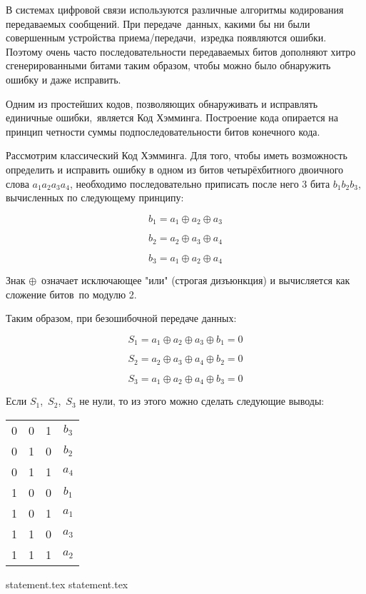 В системах цифровой связи используются различные алгоритмы кодирования передаваемых сообщений. При передаче данных, какими бы ни были совершенным устройства приема/передачи, изредка появляются ошибки. Поэтому очень часто последовательности передаваемых битов дополняют хитро сгенерированными битами таким образом, чтобы можно было обнаружить ошибку и даже исправить.

Одним из простейших кодов, позволяющих обнаруживать и исправлять единичные ошибки, является Код Хэмминга. Построение кода опирается на принцип четности суммы подпоследовательности битов конечного кода.

Рассмотрим классический Код Хэмминга. Для того, чтобы иметь возможность определить и исправить ошибку в одном из битов четырёхбитного двоичного слова $a_1a_2a_3a_4$, необходимо последовательно приписать после него 3 бита $b_1b_2b_3$, вычисленных по следующему принципу:

$$b_1 = a_1 \oplus a_2 \oplus a_3 $$

$$b_2 = a_2 \oplus a_3 \oplus a_4 $$

$$b_3 = a_1 \oplus a_2 \oplus a_4 $$

Знак $\oplus$ означает исключающее "или" (строгая дизъюнкция) и вычисляется как сложение битов по модулю 2.

Таким образом, при безошибочной передаче данных:

$$S_1 = a_1 \oplus a_2 \oplus a_3 \oplus b_1 = 0 $$

$$S_2 = a_2 \oplus a_3 \oplus a_4 \oplus b_2 = 0 $$

$$S_3 = a_1 \oplus a_2 \oplus a_4 \oplus b_3 = 0 $$

Если $S_1$, $S_2$, $S_3$ не нули, то из этого можно сделать следующие выводы:

\begin{tabular}{c c c c}
    0 & 0 & 1 & $b_3$ \\
    0 & 1 & 0 & $b_2$ \\
    0 & 1 & 1 & $a_4$ \\
    1 & 0 & 0 & $b_1$ \\
    1 & 0 & 1 & $a_1$ \\
    1 & 1 & 0 & $a_3$ \\
    1 & 1 & 1 & $a_2$ \\
\end{tabular}

{statement.tex}
{statement.tex}

